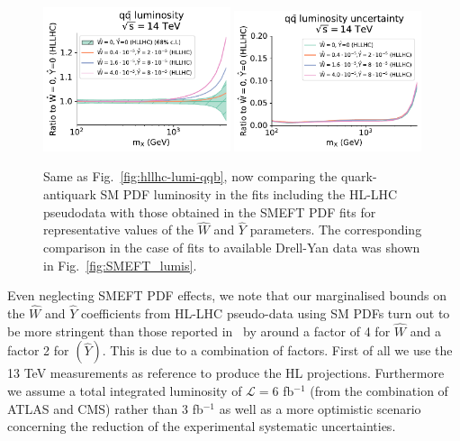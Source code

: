 \documentclass[withindex,glossary]{cam-thesis}
\begin{document}
\begin{figure}[t]
\begin{center}
  \includegraphics[width=0.49\textwidth]{dy_figures/HighLumiCoef_lumi_channels0_plot_lumi1d.pdf}
  \includegraphics[width=0.49\textwidth]{dy_figures/HighLumiCoef_lumi_channels0_UncRange_plot_lumi1d_uncertainties.pdf}
  \caption{\label{fig:HLlumiWY} Same as Fig.~\ref{fig:hllhc-lumi-qqb}, now comparing
    the quark-antiquark SM PDF luminosity in the fits including the HL-LHC pseudodata
    with those obtained in the SMEFT PDF fits for representative values
    of the $\hat{W}$ and $\hat{Y}$ parameters.
    The corresponding comparison in the case of fits to available Drell-Yan data
    was shown in Fig.~\ref{fig:SMEFT_lumis}.
  }
\end{center}
\end{figure}

Even neglecting SMEFT PDF effects, we note that our marginalised bounds on
the $\hat{W}$ and $\hat{Y}$ coefficients from HL-LHC pseudo-data using SM
PDFs turn out to be more stringent than those reported
in~\cite{Ricci:2020xre} by around a factor of 4 for $\hat{W}$ and a factor 2
for $(\hat{Y})$.
%
This is due to a combination of factors. First of all we use the 13
TeV measurements as reference to produce the HL
projections. Furthermore we assume a total integrated
luminosity of $\mathcal{L}=6$ fb$^{-1}$ (from the combination
of ATLAS and CMS) rather than 3 fb$^{-1}$ as well as a more optimistic
scenario concerning the reduction of the experimental systematic
uncertainties.
\end{document}
